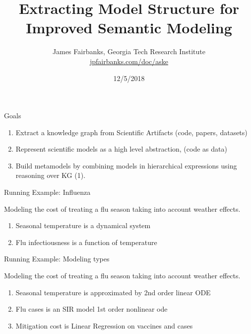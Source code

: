 \documentclass[ignorenonframetext,]{beamer}
\title{Extracting Model Structure for Improved Semantic Modeling}
\date{12/5/2018}
\author{James Fairbanks, Georgia Tech Research Institute\\ \url{jpfairbanks.com/doc/aske}}
\providecommand{\tightlist}{%
  \setlength{\itemsep}{0pt}\setlength{\parskip}{0pt}}
\begin{document}
\begin{frame}
\maketitle{}
\end{frame}

\begin{frame}{Goals}
\protect\hypertarget{goals}{}

\begin{enumerate}
\tightlist
\item
  Extract a knowledge graph from Scientific Artifacts (code, papers,
  datasets)
\item
  Represent scientific models as a high level abstraction, (code as data)
\item
  Build metamodels by combining models in hierarchical expressions using
  reasoning over KG (1).
\end{enumerate}

\end{frame}

\begin{frame}{Running Example: Influenza}
\protect\hypertarget{running-example-influenza}{}

Modeling the cost of treating a flu season taking into account weather
effects.

\begin{enumerate}
\tightlist
\item
  Seasonal temperature is a dynamical system
\item
  Flu infectiousness is a function of temperature
\end{enumerate}

\end{frame}

\begin{frame}{Running Example: Modeling types}
\protect\hypertarget{running-example-modeling-types}{}

Modeling the cost of treating a flu season taking into account weather
effects.

\begin{enumerate}
\tightlist
\item
  Seasonal temperature is approximated by 2nd order linear ODE
\item
  Flu cases is an SIR model 1st order nonlinear ode
\item
  Mitigation cost is Linear Regression on vaccines and cases
\end{enumerate}

\end{frame}
\end{document}
